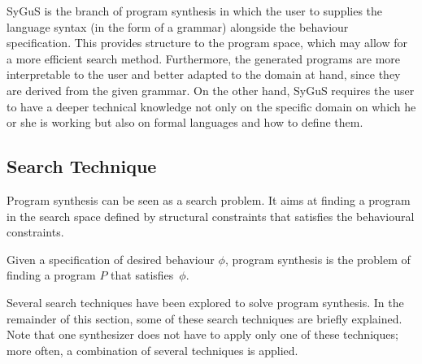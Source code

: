 \acf{SyGuS} \cite{DBLP:conf/fmcad/AlurBJMRSSSTU13} is the branch of program synthesis in which the user to supplies the language syntax (in the form of a grammar) alongside the behaviour specification. This provides structure to the program space, which may allow for a more efficient search method. Furthermore, the generated programs are more interpretable to the user and better adapted to the domain at hand, since they are derived from the given grammar. On the other hand, \ac{SyGuS} requires the user to have a deeper technical knowledge not only on the specific domain on which he or she is working but also on formal languages and how to define them.



\subsection{Search Technique}\label{sec:search-technique}

Program synthesis can be seen as a search problem. It aims at finding a program in the search space defined by structural constraints that satisfies the behavioural constraints.

\begin{definition}
Given a specification of desired behaviour \(\phi\), program synthesis is the problem of finding a program \(P\) that satisfies~\(\phi\).
\end{definition}


Several search techniques have been explored to solve program synthesis. In the remainder of this section, some of these search techniques are briefly explained. Note that one synthesizer does not have to apply only one of these techniques; more often, a combination of several techniques is applied.

